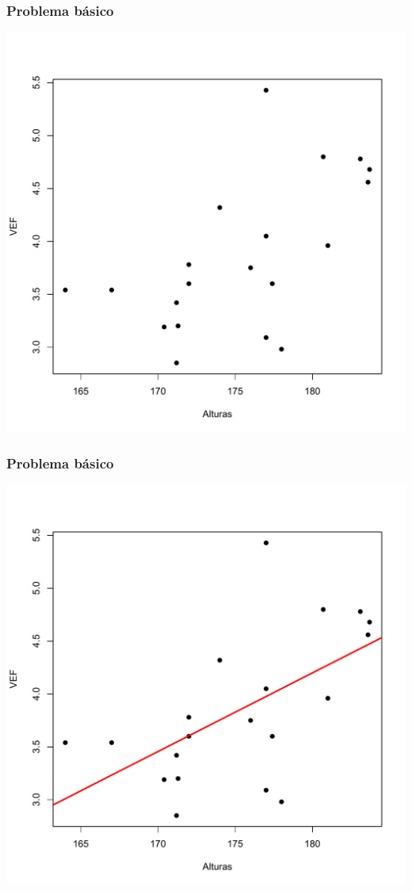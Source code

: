 \documentclass[12pt,t]{beamer}
\theoremstyle{plain}
\theoremstyle{definition}
\begin{document}
\begin{frame}
\frametitle{Problema básico}
\vspace*{-1cm}

\begin{center}
\includegraphics[width=0.8\linewidth]{plotVEF1.pdf}
\end{center}
\end{frame}


\begin{frame}
\frametitle{Problema básico}
\vspace*{-1cm}

\begin{center}
\includegraphics[width=0.8\linewidth]{plotVEF2.pdf}
\end{center}
\end{frame}
\end{document}
